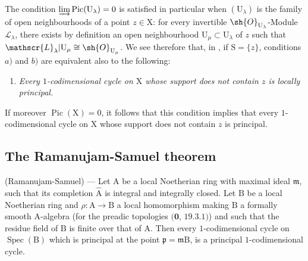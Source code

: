 \begin{remark}[21.13.16]
The condition $\varinjlim\operatorname{Pic}(\mathrm{U}_\lambda)=0$ is satisfied in particular when $(\mathrm{U}_\lambda)$ is the family of open neighbourhoods of a point $z\in\mathrm{X}$: for every invertible $\sh{O}_{\mathrm{U}_\lambda}$-Module $\mathscr{L}_\lambda$, there exists by definition an open neighbourhood $\mathrm{U}_\mu\subset\mathrm{U}_\lambda$ of $z$ such that $\mathscr{L}_\lambda|\mathrm{U}_\mu\cong\sh{O}_{\mathrm{U}_\mu}$.
We see therefore that, in , if $\mathrm{S}=\{z\}$, conditions $a)$ and $b)$ are equivalent also to the following:
\begin{enumerate}
  \item[c)] \emph{Every $1$-codimensional cycle on $\mathrm{X}$ whose support does not contain $z$ is locally principal.}
\end{enumerate}

If moreover $\operatorname{Pic}(\mathrm{X})=0$, it follows that this condition implies that every $1$-codimensional cycle on $\mathrm{X}$ whose support does not contain $z$ is principal.
\end{remark}

\subsection{The Ramanujam-Samuel theorem}
\label{subsection:IV.21.14}
\label{IV.21.14}

\begin{theorem}[21.14.1]
\label{IV.21.14.1}
\textup{(Ramanujam-Samuel)} ---
Let $\mathrm{A}$ be a local Noetherian ring with maximal ideal $\mathfrak{m}$, such that its completion $\widehat{\mathrm{A}}$ is integral and integrally closed.
Let $\mathrm{B}$ be a local Noetherian ring and $\rho:\mathrm{A}\to\mathrm{B}$ a local homomorphism making $\mathrm{B}$ a formally smooth $\mathrm{A}$-algebra (for the preadic topologies $(\mathbf{0}$, $19.3.1)$) and such that the residue field of $\mathrm{B}$ is finite over that of $\mathrm{A}$.
Then every $1$-codimensional cycle on $\operatorname{Spec}(\mathrm{B})$ which is principal at the point $\mathfrak{p}=\mathfrak{m}\mathrm{B}$, is a principal $1$-codimensional cycle.
\end{theorem}

